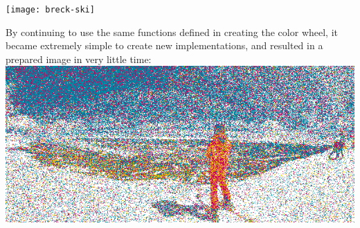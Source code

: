 \documentclass{article}
\begin{document}
\begin{multicols}{2}
\noindent
\texttt{[image: breck-ski]}
\

\noindent
By continuing to use the same functions defined in creating the color wheel, it became extremely simple to create new implementations, and resulted in a prepared image in very little time:
\\

\noindent
\noindent
\includegraphics[width=\columnwidth]{breck-ski-600}


\end{multicols}
\end{document}
